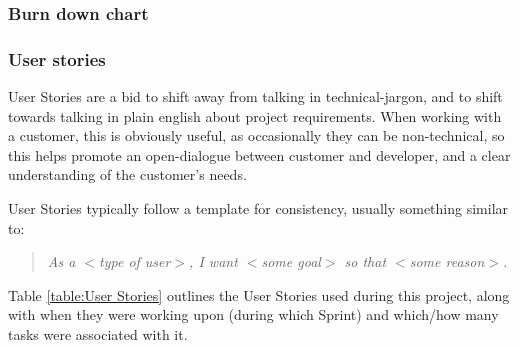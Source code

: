 \subsubsection{Burn down chart}
\subsubsection{User stories}

User Stories are a bid to shift away from talking in technical-jargon, and to shift towards talking in plain english about project requirements. When working with a customer, this is obviously useful, as occasionally they can be non-technical, so this helps promote an open-dialogue between customer and developer, and a clear understanding of the customer's needs.

User Stories typically follow a template for consistency, usually something similar to:

\begin{quotation}
  \textit{As a $<$type of user$>$, I want $<$some goal$>$ so that $<$some reason$>$.} \cite{user_story}
\end{quotation}

Table \ref{table:User Stories} outlines the User Stories used during this project, along with when they were working upon (during which Sprint) and which/how many tasks were associated with it.

